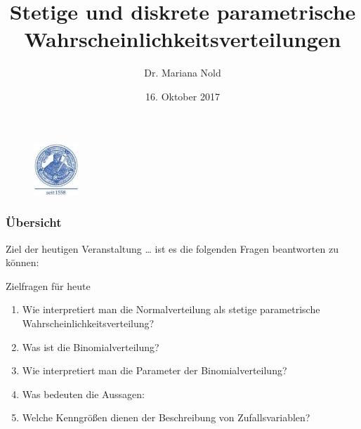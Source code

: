 \documentclass[usenames,dvipsnames,handout]{beamer}
\begin{document}
\author[Dr. Mariana Nold]{Dr. Mariana Nold}
 \date{}
\title [Deskriptive und Induktive Statistik]{Stetige und diskrete 
parametrische  Wahrscheinlichkeitsverteilungen}
\date{16. Oktober 2017}
\begin{frame}
\maketitle

  \begin{figure}[ht]
 	\centering
 	      \includegraphics[width=0.15\textwidth]{index.jpeg}
 	\end{figure}
\end{frame} 

\begin{frame}
  \frametitle{Übersicht}
  \tableofcontents
\end{frame}



\begin{frame}{Ziel der heutigen Veranstaltung \dots}
ist es die folgenden Fragen beantworten zu können:
\begin{block}{Zielfragen für heute}
\begin{enumerate}
\item{Wie interpretiert man die Normalverteilung als stetige
parametrische Wahrscheinlichkeitsverteilung?}
\item{Was ist die Binomialverteilung?}
\item{Wie interpretiert man die Parameter der Binomialverteilung?}
\item{Was bedeuten die Aussagen:}
\item{Welche Kenngrößen dienen der Beschreibung von Zufallsvariablen?}
\end{enumerate}
\end{block}
\end{frame}
\end{document}

